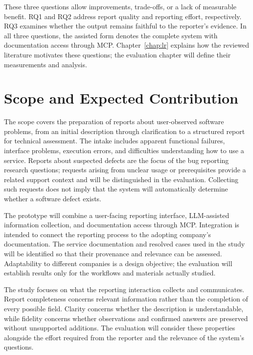 These three questions allow improvements, trade-offs, or a lack of measurable benefit. RQ1 and RQ2 address report quality and reporting effort, respectively. RQ3 examines whether the output remains faithful to the reporter's evidence. In all three questions, the assisted form denotes the complete system with documentation access through MCP. Chapter~\ref{chap:lr} explains how the reviewed literature motivates these questions; the evaluation chapter will define their measurements and analysis.

\section{Scope and Expected Contribution}
\label{sec:scope}

The scope covers the preparation of reports about user-observed software problems, from an initial description through clarification to a structured report for technical assessment. The intake includes apparent functional failures, interface problems, execution errors, and difficulties understanding how to use a service. Reports about suspected defects are the focus of the bug reporting research questions; requests arising from unclear usage or prerequisites provide a related support context and will be distinguished in the evaluation. Collecting such requests does not imply that the system will automatically determine whether a software defect exists.

The prototype will combine a user-facing reporting interface, LLM-assisted information collection, and documentation access through MCP. Integration is intended to connect the reporting process to the adopting company's documentation. The service documentation and resolved cases used in the study will be identified so that their provenance and relevance can be assessed. Adaptability to different companies is a design objective; the evaluation will establish results only for the workflows and materials actually studied.

The study focuses on what the reporting interaction collects and communicates. Report completeness concerns relevant information rather than the completion of every possible field. Clarity concerns whether the description is understandable, while fidelity concerns whether observations and confirmed answers are preserved without unsupported additions. The evaluation will consider these properties alongside the effort required from the reporter and the relevance of the system's questions.

